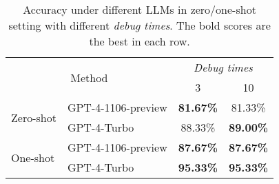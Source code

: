 \begin{table}[ht]
\caption{Accuracy under different LLMs in zero/one-shot setting with different \textit{debug times}. The bold scores are the best in each row.}
\label{tab:debugtimes}
\vspace{-8pt}
\begin{center}
\begin{tabular}{c|l|c|c}
\toprule
\multicolumn{2}{c}{\multirow{2}{*}{Method}} & \multicolumn{2}{c}{\textit{Debug times}} \\
\cmidrule{3-4}
\multicolumn{2}{c}{} & 3 & 10 \\
\midrule
\multicolumn{1}{l|}{\multirow{2}{*}{Zero-shot}} & GPT-4-1106-preview & \textbf{81.67\%} & 81.33\% \\
\multicolumn{1}{c|}{} & GPT-4-Turbo & 88.33\% & \textbf{89.00\%} \\
\midrule
\multicolumn{1}{l|}{\multirow{2}{*}{One-shot}} & GPT-4-1106-preview & \textbf{87.67\%} & \textbf{87.67\%} \\
\multicolumn{1}{c|}{} & GPT-4-Turbo & \textbf{95.33\%} & \textbf{95.33\%} \\
\bottomrule
\end{tabular}
\end{center}
\vspace{-10pt}
\end{table}

